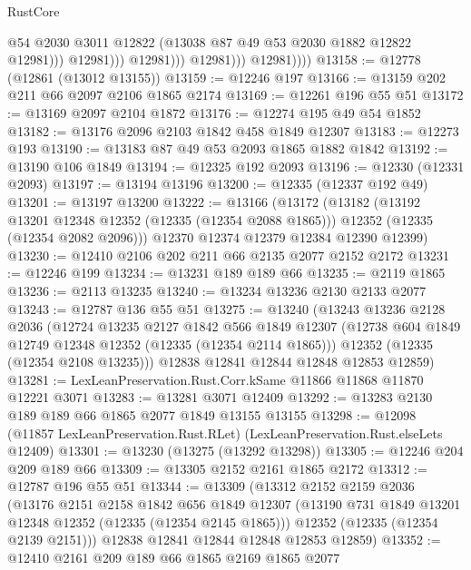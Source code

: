 \begin{lexlean}{RustCore}
\begin{coremodule}
                                  @54
                                  @2030
                                  @3011
                                  @12822
                                  (@13038 @87 @49 @53 @2030 @1882 @12822 @12981)))
                              @12981)))
                        @12981)))
                  @12981)))
            @12981))))
@13158 := @12778 (@12861 (@13012 @13155))
@13159 := @12246 @197
@13166 := @13159 @202 @211 @66 @2097 @2106 @1865 @2174
@13169 := @12261 @196 @55 @51
@13172 := @13169 @2097 @2104 @1872
@13176 := @12274 @195 @49 @54 @1852
@13182 := @13176 @2096 @2103 @1842 @458 @1849 @12307
@13183 := @12273 @193
@13190 := @13183 @87 @49 @53 @2093 @1865 @1882 @1842
@13192 := @13190 @106 @1849
@13194 := @12325 @192 @2093
@13196 := @12330 (@12331 @2093)
@13197 := @13194 @13196
@13200 := @12335 (@12337 @192 @49)
@13201 := @13197 @13200
@13222 := @13166
    (@13172
      (@13182
        (@13192 @13201 @12348 @12352 (@12335 (@12354 @2088 @1865)))
        @12352
        (@12335 (@12354 @2082 @2096)))
      @12370
      @12374
      @12379
      @12384
      @12390
      @12399)
@13230 := @12410 @2106 @202 @211 @66 @2135 @2077 @2152 @2172
@13231 := @12246 @199
@13234 := @13231 @189 @189 @66
@13235 := @2119 @1865
@13236 := @2113 @13235
@13240 := @13234 @13236 @2130 @2133 @2077
@13243 := @12787 @136 @55 @51
@13275 := @13240
    (@13243
      @13236
      @2128
      @2036
      (@12724
        @13235
        @2127
        @1842
        @566
        @1849
        @12307
        (@12738 @604 @1849 @12749 @12348 @12352 (@12335 (@12354 @2114 @1865)))
        @12352
        (@12335 (@12354 @2108 @13235)))
      @12838
      @12841
      @12844
      @12848
      @12853
      @12859)
@13281 := LexLeanPreservation.Rust.Corr.kSame @11866 @11868 @11870 @12221 @3071
@13283 := @13281 @3071 @12409
@13292 := @13283 @2130 @189 @189 @66 @1865 @2077 @1849 @13155 @13155
@13298 := @12098 (@11857 LexLeanPreservation.Rust.RLet) (LexLeanPreservation.Rust.elseLets @12409)
@13301 := @13230 (@13275 (@13292 @13298))
@13305 := @12246 @204 @209 @189 @66
@13309 := @13305 @2152 @2161 @1865 @2172
@13312 := @12787 @196 @55 @51
@13344 := @13309
    (@13312
      @2152
      @2159
      @2036
      (@13176
        @2151
        @2158
        @1842
        @656
        @1849
        @12307
        (@13190 @731 @1849 @13201 @12348 @12352 (@12335 (@12354 @2145 @1865)))
        @12352
        (@12335 (@12354 @2139 @2151)))
      @12838
      @12841
      @12844
      @12848
      @12853
      @12859)
@13352 := @12410 @2161 @209 @189 @66 @1865 @2169 @1865 @2077

\end{coremodule}
\end{lexlean}

